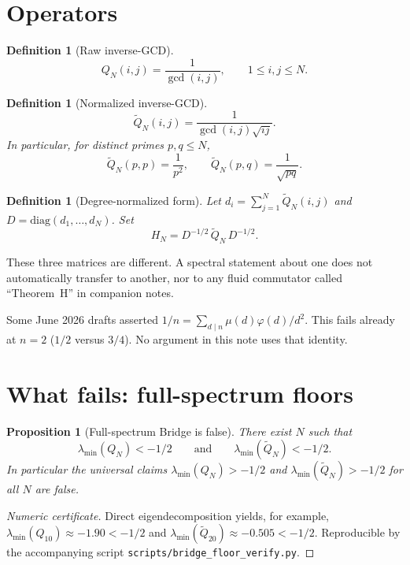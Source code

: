 \documentclass[11pt]{article}
\newtheorem{proposition}[theorem]{Proposition}
\newtheorem{definition}[theorem]{Definition}
\newcommand{\Qt}{\widetilde{Q}}
\newcommand{\lmin}{\lambda_{\min}}
\begin{document}
\section{Operators}

\begin{definition}[Raw inverse-GCD]
\[
Q_N(i,j)=\frac{1}{\gcd(i,j)},\qquad 1\le i,j\le N.
\]
\end{definition}

\begin{definition}[Normalized inverse-GCD]
\[
\Qt_N(i,j)=\frac{1}{\gcd(i,j)\sqrt{ij}}.
\]
In particular, for distinct primes $p,q\le N$,
\[
\Qt_N(p,p)=\frac1{p^2},\qquad
\Qt_N(p,q)=\frac1{\sqrt{pq}}.
\]
\end{definition}

\begin{definition}[Degree-normalized form]
Let $d_i=\sum_{j=1}^N \Qt_N(i,j)$ and $D=\mathrm{diag}(d_1,\ldots,d_N)$.
Set
\[
H_N = D^{-1/2}\,\Qt_N\,D^{-1/2}.
\]
\end{definition}

\begin{remark}[Hygiene]
These three matrices are different.
A spectral statement about one does not automatically transfer to another,
nor to any fluid commutator called ``Theorem~H'' in companion notes.
\end{remark}

\begin{remark}
Some June 2026 drafts asserted
$1/n=\sum_{d\mid n}\mu(d)\varphi(d)/d^2$.
This fails already at $n=2$ ($1/2$ versus $3/4$).
No argument in this note uses that identity.
\end{remark}

\section{What fails: full-spectrum floors}

\begin{proposition}[Full-spectrum Bridge is false]\label{prop:floorfails}
There exist $N$ such that
\[
\lmin(Q_N)<-1/2
\qquad\text{and}\qquad
\lmin(\Qt_N)<-1/2.
\]
In particular the universal claims
$\lmin(Q_N)>-1/2$ and $\lmin(\Qt_N)>-1/2$ for all $N$ are false.
\end{proposition}

\begin{proof}[Numeric certificate]
Direct eigendecomposition yields, for example,
$\lmin(Q_{10})\approx -1.90<-1/2$ and
$\lmin(\Qt_{20})\approx -0.505<-1/2$.
Reproducible by the accompanying script
\texttt{scripts/bridge\_floor\_verify.py}.
\end{proof}
\end{document}
